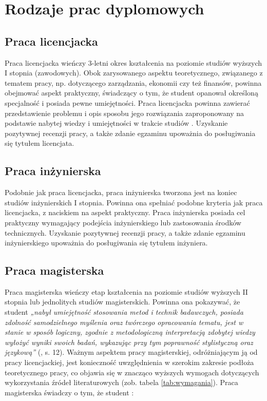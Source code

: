\chapter{Rodzaje prac dyplomowych}
\label{chap:pierwszy}



\section{Praca licencjacka}

Praca licencjacka wieńczy 3-letni okres kształcenia na poziomie studiów wyższych I stopnia (zawodowych). Obok zarysowanego aspektu teoretycznego, związanego z tematem pracy, np. dotyczącego zarządzania, ekonomii czy też finansów, powinna obejmować aspekt praktyczny, świadczący o tym, że student opanował określoną specjalność i posiada pewne umiejętności. Praca licencjacka powinna zawierać przedstawienie problemu i opis sposobu jego rozwiązania zaproponowany na podstawie nabytej wiedzy i umiejętności w trakcie studiów \citep{stoczewska}. Uzyskanie pozytywnej recenzji pracy, a także zdanie egzaminu upoważnia do posługiwania się tytułem licencjata.

\section{Praca inżynierska}
Podobnie jak praca licencjacka, praca inżynierska tworzona jest na koniec studiów inżynierskich I stopnia. Powinna ona spełniać podobne kryteria jak praca licencjacka, z naciskiem na aspekt praktyczny. Praca inżynierska posiada cel praktyczny wymagający podejścia inżynierskiego lub zastosowania środków technicznych. Uzyskanie pozytywnej recenzji pracy, a także zdanie egzaminu inżynierskiego upoważnia do posługiwania się tytułem inżyniera.

\section{Praca magisterska}
Praca magisterska wieńczy etap kształcenia na poziomie studiów wyższych II stopnia lub jednolitych studiów magisterskich. Powinna ona pokazywać, że student \textit{„nabył umiejętność stosowania metod i technik badawczych, posiada zdolność samodzielnego myślenia oraz twórczego opracowania tematu, jest w stanie w sposób logiczny, zgodnie z metodologiczną interpretacją zdobytej wiedzy wyłożyć wyniki swoich badań, wykazując przy tym poprawność stylistyczną oraz językową”} (\citealt{stoczewska}, s. 12). Ważnym aspektem pracy magisterskiej, odróżniającym ją od pracy licencjackiej, jest konieczność uwzględnienia w szerokim zakresie podłoża teoretycznego pracy, co objawia się w znacząco wyższych wymogach dotyczących wykorzystania źródeł literaturowych (zob. tabela \ref{tab:wymagania}). Praca magisterska świadczy o tym, że student \citep{zenderowski}:

